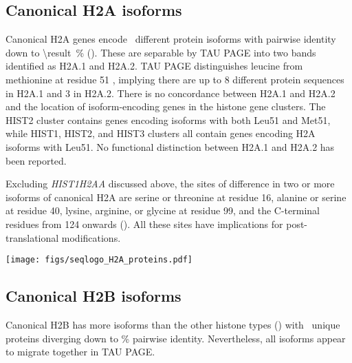   \subsection{Canonical H2A isoforms}
    Canonical H2A genes encode \HTwoAUniqueProteins{}~different
    protein isoforms with pairwise identity down to
     \SI{\result}{\percent} ().
    These are separable by TAU PAGE into two bands identified as H2A.1 and H2A.2.
    TAU PAGE distinguishes leucine from methionine at residue 51 \citep{FranklinZweidler1977,Zweidler1977},
    implying there are up to 8 different protein sequences in H2A.1 and 3 in H2A.2.
    There is no concordance between H2A.1 and H2A.2
    and the location of isoform-encoding genes in the histone gene clusters.
    The HIST2 cluster contains genes encoding isoforms with both Leu51 and Met51,
    while HIST1, HIST2, and HIST3 clusters all contain genes encoding H2A isoforms with Leu51.
    No functional distinction between H2A.1 and H2A.2 has been reported.

    Excluding \textit{HIST1H2AA} discussed above,
    the sites of difference in two or more isoforms of canonical H2A are
    serine or threonine at residue 16,
    alanine or serine at residue 40,
    lysine, arginine, or glycine at residue 99,
    and the C-terminal residues from 124 onwards ().
    All these sites have implications for post-translational modifications.

    \begin{table}
      \caption{%
        Canonical H2A encoded protein isoforms.
        Upper panel shows isoform variations relative to most common isoform
        using HGVS recommended nomenclature \citep{mutnomenclature2003}.
        Lower panel shows sequence logo of all isoforms aligned
        with invariant residues in grey.
      }
      \label{tab:H2A-consensus}
      
      \texttt{[image: figs/seqlogo\_H2A\_proteins.pdf]}
    \end{table}

  \subsection{Canonical H2B isoforms}
    Canonical H2B has more isoforms than the other histone types ()
    with \HTwoBUniqueProteins{}~unique proteins
    diverging down to \result\% pairwise identity.
    Nevertheless, all isoforms appear to migrate together in TAU PAGE.

